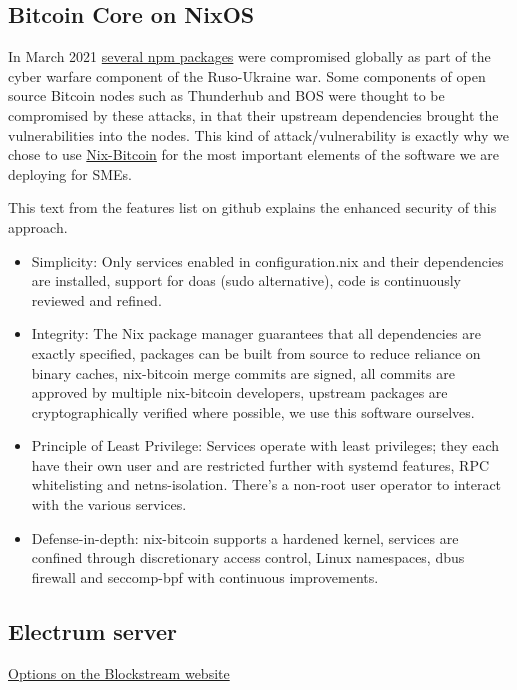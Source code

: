 \subsection{Bitcoin Core on NixOS}
In March 2021 \href{https://www.whitesourcesoftware.com/whitesource-npm-threat-report-for-javascript-package-registry/}{several npm packages} were compromised globally as part of the cyber warfare component of the Ruso-Ukraine war. Some components of open source Bitcoin nodes such as Thunderhub and BOS were thought to be compromised by these attacks, in that their upstream dependencies brought the vulnerabilities into the nodes. This kind of attack/vulnerability is exactly why we chose to use \href{https://github.com/fort-nix/nix-bitcoin/#features}{Nix-Bitcoin} for the most important elements of the software we are deploying for SMEs.\par
This text from the features list on github explains the enhanced security of this approach.
\begin{itemize}
\item Simplicity: Only services enabled in configuration.nix and their dependencies are installed, support for doas (sudo alternative), code is continuously reviewed and refined.
\item Integrity: The Nix package manager guarantees that all dependencies are exactly specified, packages can be built from source to reduce reliance on binary caches, nix-bitcoin merge commits are signed, all commits are approved by multiple nix-bitcoin developers, upstream packages are cryptographically verified where possible, we use this software ourselves.
\item Principle of Least Privilege: Services operate with least privileges; they each have their own user and are restricted further with systemd features, RPC whitelisting and netns-isolation. There's a non-root user operator to interact with the various services.
\item Defense-in-depth: nix-bitcoin supports a hardened kernel, services are confined through discretionary access control, Linux namespaces, dbus firewall and seccomp-bpf with continuous improvements.
\end{itemize}
\subsection{Electrum server}
\href{https://blog.blockstream.com/en-esplora-and-other-alternatives-to-electrumx/}{Options on the Blockstream website}
